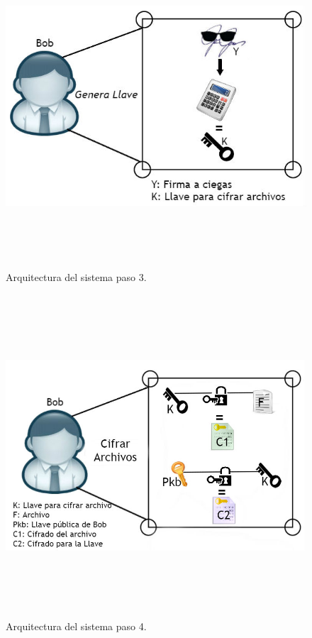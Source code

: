\begin{figure}[H]
\centering
	\includegraphics[width=16cm, height=12cm]{./images/Paso03.jpg}
	\caption{Arquitectura del sistema paso 3.}

\end{figure}

\begin{figure}[H]
\centering
	\includegraphics[width=16cm, height=12cm]{./images/Paso04.jpg}
	\caption{Arquitectura del sistema paso 4.}

\end{figure}

